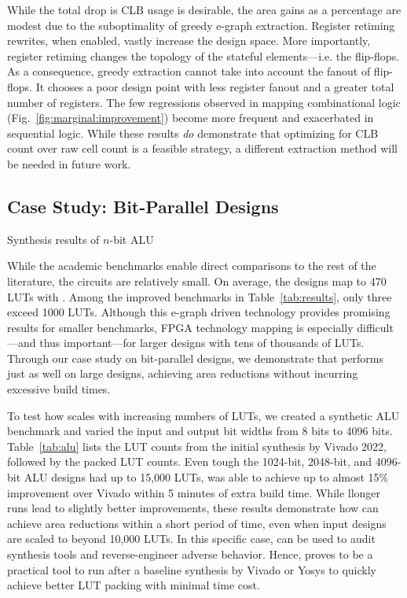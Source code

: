 While the total drop is CLB usage is desirable, the area gains as a percentage
are modest due to the suboptimality of greedy e-graph extraction. Register
retiming rewrites, when enabled, vastly increase the design space. More
importantly, register retiming changes the topology of the stateful
elements---i.e. the flip-flops. As a consequence, greedy extraction cannot take
into account the fanout of flip-flops. It chooses a poor design point with less
register fanout and a greater total number of registers. The few regressions
observed in mapping combinational logic (Fig.~\ref{fig:marginal:improvement})
become more frequent and exacerbated in sequential logic. While these results
\textit{do} demonstrate that optimizing for CLB count over raw cell count is a
feasible strategy, a different extraction method will be needed in future work.

\subsection{Case Study: Bit-Parallel Designs}\label{sec:results:scalability}
\begin{table}
    \centering
    \caption{Synthesis results of $n$-bit ALU}\label{tab:alu}
\end{table}

While the academic benchmarks enable direct comparisons to the rest of the
literature, the circuits are relatively small. On average, the designs map to
470 LUTs with \shortname{}. Among the \nimproved{} improved benchmarks in
Table~\ref{tab:results}, only three exceed 1000 LUTs. Although this e-graph
driven technology provides promising results for smaller benchmarks, FPGA
technology mapping is especially difficult---and thus important---for larger
designs with tens of thousands of LUTs. Through our case study on bit-parallel
designs, we demonstrate that \shortname{} performs just as well on large
designs, achieving area reductions without incurring excessive build times.

To test how \shortname{} scales with increasing numbers of LUTs, we created a
synthetic ALU benchmark and varied the input and output bit widths from 8 bits
to 4096 bits. Table~\ref{tab:alu} lists the LUT counts from the initial
synthesis by Vivado 2022, followed by the packed LUT counts. Even tough the
1024-bit, 2048-bit, and 4096-bit ALU designs had up to 15,000 LUTs,
\shortname{} was able to achieve up to almost 15\% improvement over Vivado
within 5 minutes of extra build time. While llonger runs lead to slightly
better improvements, these results demonstrate how \shortname{} can achieve
area reductions within a short period of time, even when input designs are
scaled to beyond 10,000 LUTs. In this specific case, \shortname{} can be used
to audit synthesis tools and reverse-engineer adverse behavior. Hence,
\shortname{} proves to be a practical tool to run after a baseline synthesis by
Vivado or Yosys to quickly achieve better LUT packing with minimal time cost.
